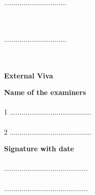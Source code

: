 \begin{minipage}[t]{0.3\textwidth}%
\small{\color{gray!18}................................}\\
{}\\
\\
\end{minipage}

\begin{minipage}[t]{0.3\textwidth}%
\small{\color{black!18}................................}\\
{}\\
\\
\end{minipage}

\begin{center}
	\textbf{{\color{blue}External Viva}}
\end{center}

\begin{minipage}[t]{0.62\textwidth}%
\textbf{Name of the examiners}\\\\
1 \small{\color{gray!160}..........................................}\\
\\
2 \small{\color{gray!160}..........................................}\\
\end{minipage}\hspace{0.07cm}

\begin{minipage}[t]{0.62\textwidth}%
\textbf{Signature with date}\\\\
 \small{\color{gray!160}...........................................}\\
\\
 \small{\color{gray!160}...........................................}\\
\end{minipage}
